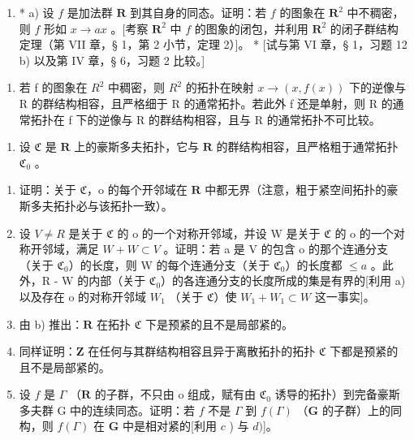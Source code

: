 \ExerciseGroupsStart
\ExerciseSection

\begin{enumerate}
\def\labelenumi{\arabic{enumi})}
\tightlist
\item
  * a) 设 \(f\) 是加法群 \(\mathbf{R}\) 到其自身的同态。证明：若 \(f\) 的图象在 \(\mathbf{R}^2\) 中不稠密，则 \(f\) 形如 \(x \to ax\) 。{[}考察 \(\mathbf{R}^2\) 中 \(f\) 的图象的闭包，并利用 \(\mathbf{R}^2\) 的闭子群结构定理（第 VII 章，§ 1，第 2 小节，定理 2）{]}。 * {[}试与第 VI 章，§ 1，习题 12 b) 以及第 IV 章，§ 6，习题 2 比较。{]}
\end{enumerate}

\begin{enumerate}
\def\labelenumi{\alph{enumi})}
\setcounter{enumi}{1}
\tightlist
\item
  若 f 的图象在 \(R^{2}\) 中稠密，则 \(R^{2}\) 的拓扑在映射 \(x \to (x, f(x))\) 下的逆像与 R 的群结构相容，且严格细于 R 的通常拓扑。若此外 f 还是单射，则 R 的通常拓扑在 f 下的逆像与 R 的群结构相容，且与 R 的通常拓扑不可比较。
\end{enumerate}

\begin{enumerate}
\def\labelenumi{\arabic{enumi})}
\setcounter{enumi}{1}
\tightlist
\item
  设 \(\mathfrak{C}\) 是 \(\mathbf{R}\) 上的豪斯多夫拓扑，它与 \(\mathbf{R}\) 的群结构相容，且严格粗于通常拓扑 \(\mathfrak{C}_0\) 。
\end{enumerate}

\begin{enumerate}
\def\labelenumi{\alph{enumi})}
\item
  证明：关于 \(\mathfrak{C}\)，o 的每个开邻域在 \(\mathbf{R}\) 中都无界（注意，粗于紧空间拓扑的豪斯多夫拓扑必与该拓扑一致）。
\item
  设 \(V \neq R\) 是关于 \(\mathfrak{C}\) 的 o 的一个对称开邻域，并设 W 是关于 \(\mathfrak{C}\) 的 o 的一个对称开邻域，满足 \(W + W \subset V\) 。证明：若 a 是 V 的包含 o 的那个连通分支（关于 \(\mathfrak{C}_{0}\)）的长度，则 W 的每个连通分支（关于 \(\mathfrak{C}_{0}\)）的长度都 \(\leqslant a\) 。此外，R - W 的内部（关于 \(\mathfrak{C}_{0}\)）的各连通分支的长度所成的集是有界的{[}利用 a) 以及存在 o 的对称开邻域 \(W_{1}\) （关于 \(\mathfrak{C}\)）使 \(W_{1} + W_{1} \subset W\) 这一事实{]}。
\item
  由 b) 推出：\(\mathbf{R}\) 在拓扑 \(\mathfrak{C}\) 下是预紧的且不是局部紧的。
\item
  同样证明：\(\mathbf{Z}\) 在任何与其群结构相容且异于离散拓扑的拓扑 \(\mathfrak{C}\) 下都是预紧的且不是局部紧的。
\item
  设 \(f\) 是 \(\Gamma\) （\(\mathbf{R}\) 的子群，不只由 o 组成，赋有由 \(\mathfrak{C}_0\) 诱导的拓扑）到完备豪斯多夫群 G 中的连续同态。证明：若 \(f\) 不是 \(\Gamma\) 到 \(f(\Gamma)\) （\(\mathbf{G}\) 的子群）上的同构，则 \(f(\Gamma)\) 在 \(\mathbf{G}\) 中是相对紧的{[}利用 \(c\) ) 与 \(d)\){]}。
\end{enumerate}

